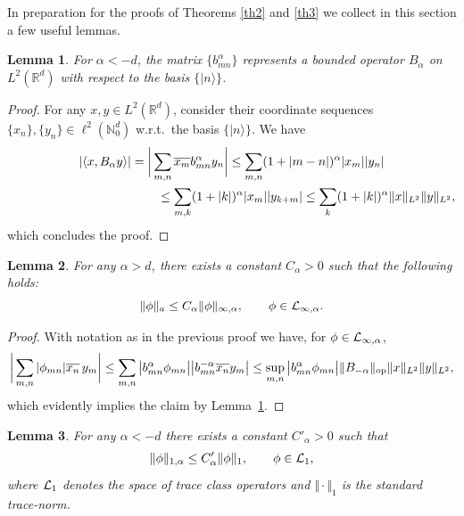 \documentclass[10pt,a4paper]{amsart}
\newtheorem{lemma}{Lemma}
\begin{document}
In preparation for the proofs of Theorems \ref{th2} and \ref{th3} we
collect in this section a few useful lemmas.

\begin{lemma}
\label{Bbounded}
For $\alpha<-d$, the matrix
$\{b_{mn}^\alpha\}$ represents a bounded operator $B_\alpha$ on
$L^2(\mathbb R^d)$ with respect to the basis $\{|n\rangle\}$.
\end{lemma}
\begin{proof}
For any $x,y\in L^2(\mathbb R^d)$, consider their coordinate sequences
$\{x_n\},\{y_n\}\in \ell^2(\mathbb N_0^d)$ w.r.t.\ the basis $\{|n\rangle\}$. We have
\begin{gather*}
\vert\langle x,B_\alpha y\rangle\vert=
\bigg|\sum_{m,n}\overline{x_m} b^\alpha_{mn} y_n\bigg| \leq
\sum_{m,n}(1+|m-n|)^\alpha |x_m| |y_n|\\
\hphantom{\vert\langle x,B_\alpha y\rangle\vert=
\bigg|\sum_{m,n}\overline{x_m} b^\alpha_{mn} y_n\bigg|}{}
\leq\sum_{m,k}(1+|k|)^\alpha |x_m| |y_{k+m}|
\leq\sum_k(1+|k|)^\alpha \Vert x\Vert_{L^2} \Vert y\Vert_{L^2} ,
\end{gather*}
which concludes the proof.
\end{proof}

\begin{lemma}\label{anorm}
For any $\alpha>d$, there exists a constant $C_\alpha>0$ such that the following holds:
\[
\Vert\phi\Vert_a\leq C_\alpha \Vert\phi\Vert_{\infty,\alpha} ,\qquad \phi\in{\cal L}_{\infty,\alpha} .
\]
\end{lemma}

\begin{proof}
With notation as in the previous proof we have, for $\phi\in{\cal L}_{\infty,\alpha}$,
\begin{gather*}
\bigg|\sum_{m,n}|\phi_{mn}| \overline{x_n}\,y_m\bigg| \leq
\sum_{m,n}\big|b^\alpha_{mn} \phi_{mn}\big|
\big|b^{-\alpha}_{mn} \overline{x_n} y_m\big|
\leq \sup_{m,n}\big|b^\alpha_{mn}\phi_{mn}\big|
 \Vert B_{-\alpha}\Vert_{\rm op} \Vert x\Vert_{L^2} \Vert y\Vert_{L^2} ,
\end{gather*}
which evidently implies the claim by Lemma~\ref{Bbounded}.
\end{proof}

\begin{lemma}\label{trace}
For any $\alpha<-d$ there exists a constant $C'_\alpha>0$ such that
\[
\Vert\phi\Vert_{1,\alpha}\leq C'_{\alpha} \Vert\phi\Vert_1 ,\qquad \phi\in{\cal L}_1 ,
\]
where ${\cal L}_1$ denotes the space of trace class operators and
$\Vert\cdot\Vert_1$ is the standard trace-norm.
\end{lemma}
\end{document}
